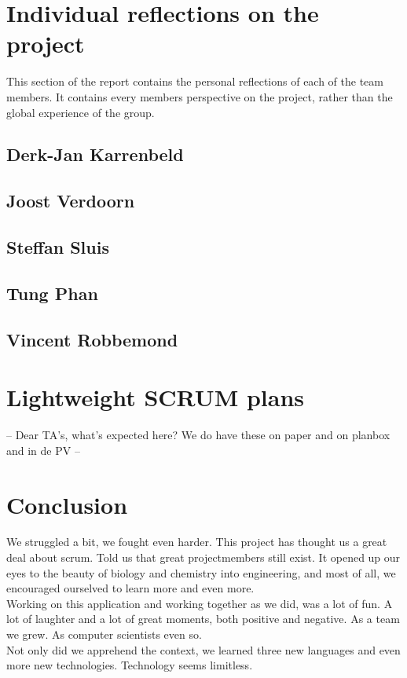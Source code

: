 \documentclass[10pt,a4paper]{report}
\begin{document}
	\section{Individual reflections on the project}
		This section of the report contains the personal reflections of each of the team members. It contains every members perspective on the project, rather than the global experience of the group.
		\subsection{Derk-Jan Karrenbeld}
			
		\subsection{Joost Verdoorn}
			
		\subsection{Steffan Sluis}
			
		\subsection{Tung Phan}
			
		\subsection{Vincent Robbemond}
			
		
	\section{Lightweight SCRUM plans}
		-- Dear TA's, what's expected here? We do have these on paper and on planbox and in de PV --
		
	\section{Conclusion}
		We struggled a bit, we fought even harder. This project has thought us a great deal about scrum. Told us that great projectmembers still exist. It opened up our eyes to the beauty of biology and chemistry into engineering, and most of all, we encouraged ourselved to learn more and even more. \\
		Working on this application and working together as we did, was a lot of fun. A lot of laughter and a lot of great moments, both positive and negative. As a team we grew. As computer scientists even so.\\
		Not only did we apprehend the context, we learned three new languages and even more new technologies. Technology seems limitless. 
	
\end{document}

